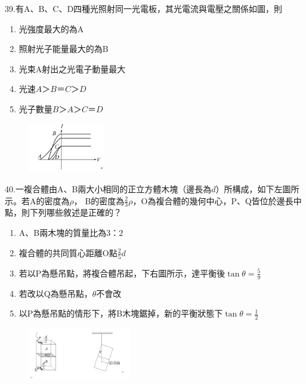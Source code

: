 \documentclass[cn,10pt,math=newtx,chinesefont=founder,device=ig]{elegantbook}
\begin{document}
\begin{example}
   39.有A、B、C、D四種光照射同一光電板，其光電流與電壓之關係如圖，則　
   \begin{enumerate}[label=(\Alph*)]
     \item 光強度最大的為A
     \item 照射光子能量最大的為B
     \item 光束A射出之光電子動量最大
     \item 光速$A＞B＝C＞D$
     \item 光子數量$B＞A＞C＝D$
   \end{enumerate}

    \rightline{[成德高中教甄109]}
\end{example}
\begin{solution}
    
\end{solution}
\begin{figure}[htbp]
    \flushright
    \includegraphics[width=0.3\textwidth]{image/109成德39.png}
  \end{figure}
\newpage



\begin{example}
   	40.一複合體由A、B兩大小相同的正立方體木塊（邊長為$d$）所構成，如下左圖所示。若A的密度為$\rho$，
     B的密度為$\frac{2}{3}\rho$，O為複合體的幾何中心，P、Q皆位於邊長中點，則下列哪些敘述是正確的？
     \begin{enumerate}[label=(\Alph*)]
       \item A、B兩木塊的質量比為$3：2$
       \item 複合體的共同質心距離O點$\frac{2}{5}d$
       \item 若以P為懸吊點，將複合體吊起，下右圖所示，達平衡後$\tan{\theta} = \frac{5}{9}$
       \item 若改以Q為懸吊點，$\theta$不會改
       \item 以P為懸吊點的情形下，將B木塊鋸掉，新的平衡狀態下$\tan{\theta} = \frac{1}{2}$
     \end{enumerate}

    \rightline{[成德高中教甄109]}
\end{example}
\begin{solution}
    
\end{solution}
\begin{figure}[htbp]
    \flushright
    \includegraphics[width=0.4\textwidth]{image/109成德40.png}
  \end{figure}
\newpage
\end{document}
